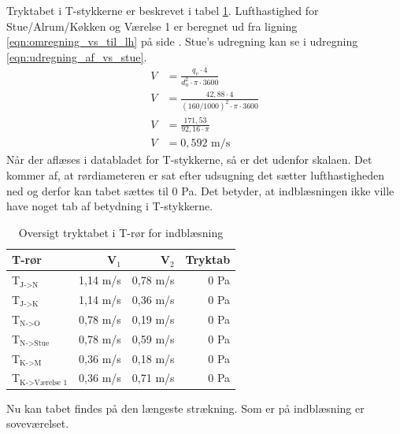 Tryktabet i T-stykkerne er beskrevet i tabel \ref{table:oversigt_tryktab_t-roer_ind}. 
Lufthastighed for Stue/Alrum/Køkken og Værelse 1 er beregnet ud fra ligning \ref{eqn:omregning_vs_til_lh} på side \pageref{eqn:omregning_vs_til_lh}.
Stue's udregning kan se i udregning \ref{eqn:udregning_af_vs_stue}.
\begin{align} \label{eqn:udregning_af_vs_stue}
    V     &= \frac{ q_v \cdot 4 }{ d_{n}^{2} \cdot \pi \cdot 3600 } \nonumber \\
    V     &= \frac{ 42,88 \cdot 4 }{ (160/1000)^{2} \cdot \pi \cdot 3600 } \nonumber \\
    V     &= \frac{ 171,53 }{ 92,16 \cdot \pi } \nonumber \\
    V     &= 0,592 \text{ m/s}
\end{align}
Når der aflæses i databladet for T-stykkerne, så er det udenfor skalaen.
Det kommer af, at rørdiameteren er sat efter udsugning det sætter lufthastigheden ned og derfor kan tabet sættes til 0 Pa.
Det betyder, at indblæsningen ikke ville have noget tab af betydning i T-stykkerne.
\begin{table}[h!]
    \begin{center}
       \begin{tabular}{|l|r|r|r|}
           \hline
           T-rør & V$_{1}$ & V$_{2}$ & Tryktab \\
           \hline
           T$_{\text{J->N}}$ & 1,14 m/s & 0,78 m/s & 0 Pa \\ 
           T$_{\text{J->K}}$ & 1,14 m/s & 0,36 m/s & 0 Pa \\ 
           T$_{\text{N->O}}$ & 0,78 m/s & 0,19 m/s & 0 Pa \\ 
           T$_{\text{N->Stue}}$ & 0,78 m/s & 0,59 m/s & 0 Pa \\ 
           T$_{\text{K->M}}$ & 0,36 m/s & 0,18 m/s & 0 Pa \\ 
           T$_{\text{K->Værelse 1}}$ & 0,36 m/s & 0,71 m/s & 0 Pa \\ 
           \hline
       \end{tabular}
   \end{center}
   \caption{Oversigt tryktabet i T-rør for indblæsning}
   \label{table:oversigt_tryktab_t-roer_ind}
\end{table}
Nu kan tabet findes på den længeste strækning. Som er på indblæsning er soveværelset.

